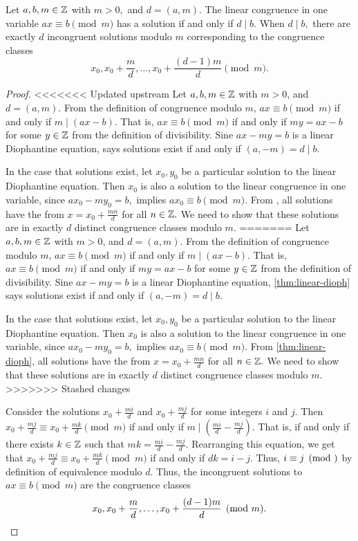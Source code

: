 \documentclass{ximera}
\begin{document}
\begin{theorem}\label{thm:lin-cong-solutions}
	Let $a,b,m\in\mathbb Z$ with $m>0,$ and $d=(a,m)$. The linear congruence in one variable $ax\equiv b\pmod m$ has a solution if and only if $d\mid b$. When $d\mid b,$ there are exactly $d$ incongruent solutions modulo $m$ corresponding to the congruence classes \[x_0, x_0+\frac{m}{d},\dots,x_0+\frac{(d-1)m}{d} \pmod m.\]

	\begin{proof}
<<<<<<< Updated upstream
		Let $a,b,m\in\mathbb Z$ with $m>0$, and $d=(a,m)$. From the definition of congruence modulo $m$, $ax\equiv b \pmod m$ if and only if $m\mid (ax-b)$. That is, $ax\equiv b \pmod m$ if and only if $my=ax-b$ for some $y\in\mathbb Z$ from the definition of divisibility. Sine $ax-my=b$ is a linear Diophantine equation,  says solutions exist if and only if $(a,-m)=d\mid b.$
		
		In the case that solutions exist, let $x_0, y_0$ be a particular solution to the linear Diophantine equation. Then $x_0$ is also a solution to the linear congruence in one variable, since $a x_0-my_0=b,$ implies $ax_0\equiv b\pmod m$. From , all solutions have the from $x=x_0+\frac{mn}{d}$ for all $n\in\mathbb Z.$  We need to show that these solutions are in exactly $d$ distinct congruence classes modulo $m.$
=======
		Let $a,b,m\in\mathbb Z$ with $m>0$, and $d=(a,m)$. From the definition of congruence modulo $m$, $ax\equiv b \pmod m$ if and only if $m\mid (ax-b)$. That is, $ax\equiv b \pmod m$ if and only if $my=ax-b$ for some $y\in\mathbb Z$ from the definition of divisibility. Sine $ax-my=b$ is a linear Diophantine equation, \cref{thm:linear-dioph} says solutions exist if and only if $(a,-m)=d\mid b.$
		
		In the case that solutions exist, let $x_0, y_0$ be a particular solution to the linear Diophantine equation. Then $x_0$ is also a solution to the linear congruence in one variable, since $a x_0-my_0=b,$ implies $ax_0\equiv b\pmod m$. From \cref{thm:linear-dioph}, all solutions have the from $x=x_0+\frac{mn}{d}$ for all $n\in\mathbb Z.$  We need to show that these solutions are in exactly $d$ distinct congruence classes modulo $m.$
>>>>>>> Stashed changes
		
		Consider the solutions $x_0+\frac{mi}{d}$ and $x_0+\frac{mj}{d}$ for some integers $i$ and $j.$ Then $x_0+\frac{mj}{d}\equiv x_0+\frac{mk}{d} \pmod m$ if and only if $m\mid \left(\frac{mi}{d}-\frac{mj}{d}\right).$ That is, if and only if there exists $k\in\mathbb Z$ such that $mk=\frac{mi}{d}-\frac{mj}{d}$. Rearranging this equation, we get that $x_0+\frac{mj}{d}\equiv x_0+\frac{mk}{d} \pmod m$ if and only if $dk=i-j.$ Thus, $i\equiv j\pmod$ by definition of equivalence modulo $d.$ Thus, the incongruent solutions to $ax\equiv b\pmod m$ are the congruence classes \[x_0, x_0+\frac{m}{d},\dots,x_0+\frac{(d-1)m}{d} \pmod m.\qedhere\]
	\end{proof}
\end{theorem}
\end{document}

